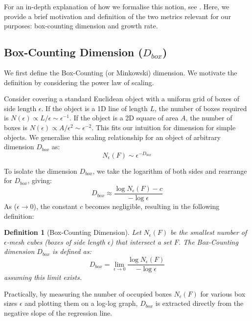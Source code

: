\documentclass[12pt, a4paper, oneside]{report}
\newtheorem{definition}[theorem]{Definition}
\theoremstyle{remark}
\begin{document}
For an in-depth explanation of how we formalise this notion, see \citet{Falconer1990}. Here, we provide a brief motivation and definition of the two metrics relevant for our purposes: box-counting dimension and growth rate.
\subsection{Box-Counting Dimension (\texorpdfstring{$D_{box}$}{D\_box})}
We first define the Box-Counting (or Minkowski) dimension. We motivate the definition by considering the power law of scaling. 

Consider covering a standard Euclidean object with a uniform grid of boxes of side length $\epsilon$. If the object is a 1D line of length $L$, the number of boxes required is $N(\epsilon) \propto L/\epsilon \sim \epsilon^{-1}$. If the object is a 2D square of area $A$, the number of boxes is $N(\epsilon) \propto A/\epsilon^2 \sim \epsilon^{-2}$. This fits our intuition for dimension for simple objects. We generalise this scaling relationship for an object of arbitrary dimension $D_{box}$ as:
\begin{equation*}
    N_{\epsilon}(F) \sim \epsilon^{-D_{box}}
\end{equation*}

To isolate the dimension $D_{box}$, we take the logarithm of both sides and rearrange for $D_{box}$, giving:
\begin{equation*}
    D_{box} \approx \frac{\log N_{\epsilon}(F) - c}{-\log \epsilon}
\end{equation*}
As ($\epsilon \to 0$), the constant $c$ becomes negligible, resulting in the following definition:

\begin{definition}[Box-Counting Dimension]
Let $N_{\epsilon}(F)$ be the smallest number of $\epsilon$-mesh cubes (boxes of side length $\epsilon$) that intersect a set $F$. The Box-Counting dimension $D_{box}$ is defined as:
\begin{equation*}
    D_{box} = \lim_{\epsilon \to 0} \frac{\log N_{\epsilon}(F)}{-\log \epsilon}
\end{equation*}
assuming this limit exists.
\end{definition}

Practically, by measuring the number of occupied boxes $N_{\epsilon}(F)$ for various box sizes $\epsilon$ and plotting them on a log-log graph, $D_{box}$ is extracted directly from the negative slope of the regression line.
\end{document}
